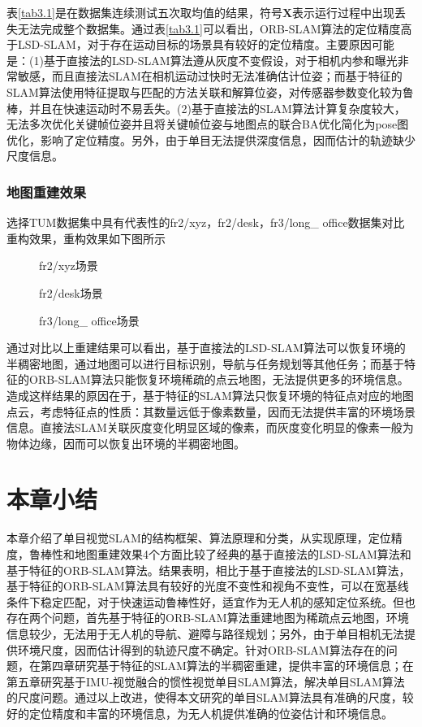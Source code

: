 表\ref{tab3.1}是在数据集连续测试五次取均值的结果，符号$\boldsymbol{X}$表示运行过程中出现丢失无法完成整个数据集。通过表\ref{tab3.1}可以看出，ORB-SLAM算法的定位精度高于LSD-SLAM，对于存在运动目标的场景具有较好的定位精度。主要原因可能是：(1)基于直接法的LSD-SLAM算法遵从灰度不变假设，对于相机内参和曝光非常敏感，而且直接法SLAM在相机运动过快时无法准确估计位姿；而基于特征的SLAM算法使用特征提取与匹配的方法关联和解算位姿，对传感器参数变化较为鲁棒，并且在快速运动时不易丢失。(2)基于直接法的SLAM算法计算复杂度较大，无法多次优化关键帧位姿并且将关键帧位姿与地图点的联合BA优化简化为pose图优化，影响了定位精度。另外，由于单目无法提供深度信息，因而估计的轨迹缺少尺度信息。

\subsubsection*{地图重建效果}
选择TUM数据集中具有代表性的fr2/xyz，fr2/desk，fr3/long\_ office数据集对比重构效果，重构效果如下图所示
\begin{figure}
\centering
\caption{fr2/xyz场景}
\label{fig3.8}
\end{figure}

\begin{figure}
\centering
\caption{fr2/desk场景}
\label{fig3.9}
\end{figure}

\begin{figure}
\centering
\caption{fr3/long\_ office场景}
\label{fig3.10}
\end{figure}

通过对比以上重建结果可以看出，基于直接法的LSD-SLAM算法可以恢复环境的半稠密地图，通过地图可以进行目标识别，导航与任务规划等其他任务；而基于特征的ORB-SLAM算法只能恢复环境稀疏的点云地图，无法提供更多的环境信息。造成这样结果的原因在于，基于特征的SLAM算法只恢复环境的特征点对应的地图点云，考虑特征点的性质：其数量远低于像素数量，因而无法提供丰富的环境场景信息。直接法SLAM关联灰度变化明显区域的像素，而灰度变化明显的像素一般为物体边缘，因而可以恢复出环境的半稠密地图。

\section{本章小结}
本章介绍了单目视觉SLAM的结构框架、算法原理和分类，从实现原理，定位精度，鲁棒性和地图重建效果4个方面比较了经典的基于直接法的LSD-SLAM算法和基于特征的ORB-SLAM算法。结果表明，相比于基于直接法的LSD-SLAM算法，基于特征的ORB-SLAM算法具有较好的光度不变性和视角不变性，可以在宽基线条件下稳定匹配，对于快速运动鲁棒性好，适宜作为无人机的感知定位系统。但也存在两个问题，首先基于特征的ORB-SLAM算法重建地图为稀疏点云地图，环境信息较少，无法用于无人机的导航、避障与路径规划；另外，由于单目相机无法提供环境尺度，因而估计得到的轨迹尺度不确定。针对ORB-SLAM算法存在的问题，在第四章研究基于特征的SLAM算法的半稠密重建，提供丰富的环境信息；在第五章研究基于IMU-视觉融合的惯性视觉单目SLAM算法，解决单目SLAM算法的尺度问题。通过以上改进，使得本文研究的单目SLAM算法具有准确的尺度，较好的定位精度和丰富的环境信息，为无人机提供准确的位姿估计和环境信息。




